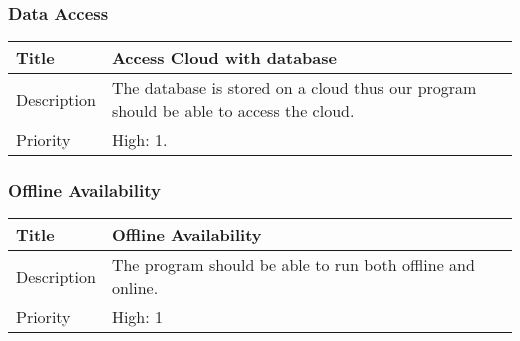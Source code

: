 \subsubsection{Data Access}
  \begin{table}[h!]
    \begin{tabularx}{\textwidth}{|l|X|}
      \hline
      Title       & Access Cloud with database \\ \hline
      Description & The database is stored on a cloud thus our program
                    should be able to access the cloud. \\ \hline
      Priority    &   High: 1. \\ \hline
    \end{tabularx}
  \end{table}

\subsubsection{Offline Availability}
  \begin{table}[h!]
    \begin{tabularx}{\textwidth}{|l|X|}
      \hline
      Title       & Offline Availability \\ \hline
      Description & The program should be able to run both offline and online.
                    \\ \hline
      Priority    & High: 1 \\ \hline
    \end{tabularx}
  \end{table}

